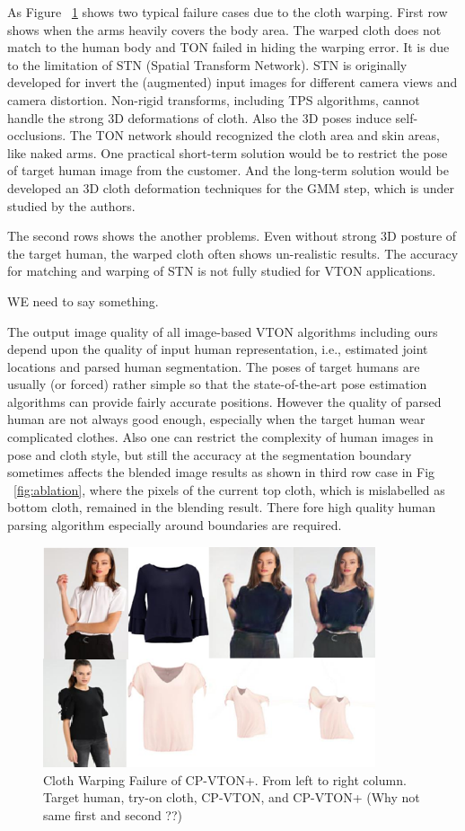 As Figure ~\ref{fig:gmmfailure} shows two typical failure cases due to the cloth warping. First row shows when the arms heavily covers the body area. The warped cloth does not match to the human body and TON failed in hiding the warping error. It is due to the limitation of STN (Spatial Transform Network). STN is originally developed for invert the (augmented) input images for different camera views and camera distortion. Non-rigid transforms, including TPS algorithms, cannot handle the strong 3D deformations of cloth.  Also the 3D poses induce self-occlusions. The TON network should recognized the cloth area and skin areas, like naked arms. One practical short-term solution would be to restrict the pose of target human image from the customer. And the long-term solution would be developed an 3D cloth deformation techniques for the GMM step, which is under studied by the authors. 

The second rows shows the another problems. Even without strong 3D posture of the target human, the warped cloth often shows un-realistic results. The accuracy for matching and warping of STN is not fully studied for VTON applications. 

WE need to say something.
    

The output image quality of all image-based VTON algorithms including ours depend upon the quality of input human representation, i.e., estimated joint locations and parsed human segmentation. The poses of target humans are usually (or forced) rather simple so that the state-of-the-art pose estimation algorithms can provide fairly accurate positions. However the quality of parsed human are not always good enough, especially when the target human wear complicated clothes. Also one can restrict the complexity of human images in pose and cloth style, but still the accuracy at the segmentation boundary sometimes affects the blended image results as shown in third row case in Fig ~\ref{fig:ablation}, where the pixels of the current top cloth, which is mislabelled as bottom cloth, remained in the blending result. There fore high quality human parsing algorithm especially around boundaries are required.   


\begin{figure}
\centering
\includegraphics[height=6.5cm, scale=1]{figures/gmmfailure.png} 
\caption{Cloth Warping Failure of CP-VTON+. From left to right column. Target human, try-on cloth, CP-VTON, and CP-VTON+  (Why not same first and second ??)
}
\label{fig:gmmfailure}
\end{figure}
 